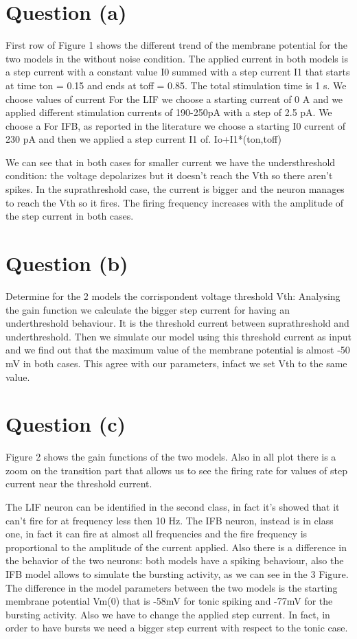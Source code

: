 \documentclass[11pt]{article}
\begin{document}
\section*{Question (a)}
First row of Figure 1 shows the different trend 
of the membrane potential for the two models in
the without noise condition.
The applied current in both models is a step current with a 
constant value I0 summed with a step current I1 that starts at
time ton = 0.15 and ends at toff = 0.85. The total stimulation
time is 1 s. 
We choose values of current 
For the LIF we choose a starting current of 0 A and we applied
different stimulation currents of 190-250pA with a step of 2.5 pA. We choose a 
For IFB, as reported in the literature we choose a starting I0 
current of 230 pA and then we applied a step current I1 of.
Io+I1*(ton,toff)

We can see that in both cases for smaller current we have the
understhreshold condition: the voltage depolarizes but it 
doesn't reach the Vth so there aren't spikes.
In the suprathreshold case, the current is bigger and the neuron 
manages to reach the Vth so it fires. 
The firing frequency increases with the 
amplitude of the step current in both cases.



\section*{Question (b)}
Determine for the 2 models the corrispondent voltage 
threshold Vth: Analysing the gain function we calculate 
the bigger step current for having an underthreshold behaviour.
It is the threshold current between suprathreshold and 
underthreshold. Then we simulate our model using this threshold 
current as input and we find out that the maximum value of 
the membrane potential is almost -50 mV in both cases. 
This agree with our parameters, infact we set Vth to the 
same value.

\section*{Question (c)}
Figure 2 shows the gain functions of the two models. 
Also in all plot there is a zoom on the transition part that 
allows us to see the firing rate for values of step current 
near the threshold current.

The LIF neuron can be identified in the second class, in fact 
it's showed that it can't fire for at frequency less then 10 Hz.
The IFB neuron, instead is in class one, in fact it can fire at
almost all frequencies and the fire frequency is proportional 
to the amplitude of the current applied.
Also there is a difference in the behavior of the two neurons:
both models have a spiking behaviour, also the IFB model allows
to simulate the bursting activity, as we can see in the 3 Figure.
The difference in the model parameters between the two models is 
the starting membrane potential Vm(0) that is -58mV for tonic 
spiking and -77mV for the bursting activity.
Also we have to change the applied step current. In fact, 
in order to have bursts we need a bigger step current with 
respect to the tonic case.
\end{document}
